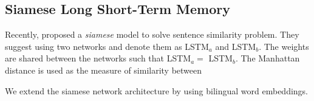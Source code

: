 \subsection{Siamese Long Short-Term Memory}%
\label{sub:siamese_long_short_term_memory}

Recently, \textcite{mueller_siamese_2016} proposed a \emph{siamese} model to solve sentence similarity problem.
They suggest using two networks and denote them as LSTM$_a$ and LSTM$_b$.
The weights are shared between the networks such that LSTM$_a = $ LSTM$_b$.
The Manhattan distance is used as the measure of similarity between

We extend the siamese network architecture by using bilingual word embeddings.


\textcite{zeiler_adadelta_2012}


